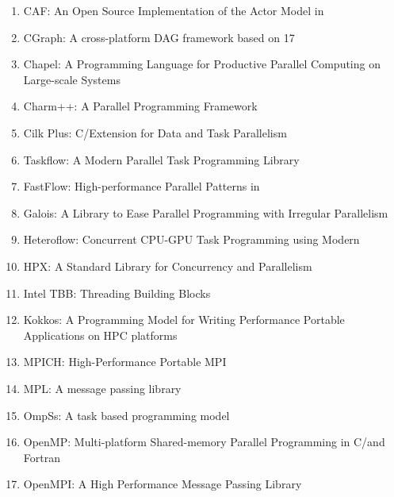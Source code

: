 \begin{enumerate}[topsep=0pt,noitemsep]
  \setlength\itemsep{0.5em}
  \item CAF: An Open Source Implementation of the Actor Model in \cpp

  \item CGraph: A cross-platform DAG framework based on {\cpp}17

  \item Chapel: A Programming Language for Productive Parallel Computing on Large-scale Systems

  \item Charm++: A Parallel Programming Framework

  \item Cilk Plus: C/\cpp Extension for Data and Task Parallelism

  \item Taskflow: A Modern \cpp Parallel Task Programming Library

  \item FastFlow: High-performance Parallel Patterns in \cpp

  \item Galois: A \cpp Library to Ease Parallel Programming with Irregular Parallelism

  \item Heteroflow: Concurrent CPU-GPU Task Programming using Modern \cpp

  \item HPX: A \cpp Standard Library for Concurrency and Parallelism

  \item Intel TBB: Threading Building Blocks

  \item Kokkos: A \cpp Programming Model for Writing Performance Portable Applications on HPC platforms

  \item MPICH: High-Performance Portable MPI

  \item MPL: A message passing library

  \item OmpSs: A task based programming model

  \item OpenMP: Multi-platform Shared-memory Parallel Programming in C/\cpp and Fortran

  \item OpenMPI: A High Performance Message Passing Library


\end{enumerate}
